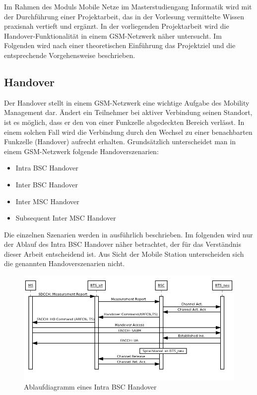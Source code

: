 
Im Rahmen des Moduls Mobile Netze im Masterstudiengang Informatik wird mit der Durchführung einer Projektarbeit, das in der Vorlesung vermittelte Wissen praxisnah vertieft und  ergänzt. In der vorliegenden Projektarbeit wird die Handover-Funktionalität in einem GSM-Netzwerk näher untersucht. Im Folgenden wird nach einer theoretischen Einführung das Projektziel und die entsprechende Vorgehensweise beschrieben.

\subsection{Handover}\label{sec:handover}

Der Handover stellt in einem GSM-Netzwerk eine wichtige Aufgabe des Mobility Management dar. Ändert ein Teilnehmer bei aktiver Verbindung seinen Standort, ist es möglich, dass er den von einer Funkzelle abgedeckten Bereich verlässt. In einem solchen Fall wird die Verbindung durch den Wechsel zu einer benachbarten Funkzelle (Handover) aufrecht erhalten. Grundsätzlich unterscheidet man in einem GSM-Netzwerk folgende Handoverszenarien:

\begin{itemize}
 \item Intra BSC Handover
 \item Inter BSC Handover
 \item Inter MSC Handover
 \item Subsequent Inter MSC Handover
\end{itemize}

Die einzelnen Szenarien werden in \cite{bib:grundkursmks} ausführlich beschrieben. Im folgenden wird nur der Ablauf des Intra BSC Handover näher betrachtet, der für das Verständnis dieser Arbeit entscheidend ist. Aus Sicht der Mobile Station unterscheiden sich die genannten Handoverszenarien nicht.

\begin{figure}[h!]
  \centering
  \includegraphics[width=\textwidth]{img/ablauf_handover}
  \caption{Ablaufdiagramm eines Intra BSC Handover}
  \label{fig:adhandover}
\end{figure}

